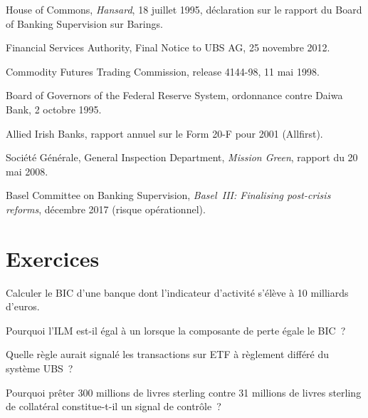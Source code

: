 \begin{omsources}
\item House of Commons, \emph{Hansard}, 18 juillet 1995, déclaration sur le rapport du Board of Banking Supervision
sur Barings.
\item Financial Services Authority, Final Notice to UBS AG, 25 novembre 2012.
\item Commodity Futures Trading Commission, release 4144-98, 11 mai 1998.
\item Board of Governors of the Federal Reserve System, ordonnance contre Daiwa Bank, 2 octobre 1995.
\item Allied Irish Banks, rapport annuel sur le Form 20-F pour 2001 (Allfirst).
\item Société Générale, General Inspection Department, \emph{Mission Green}, rapport du 20 mai 2008.
\item Basel Committee on Banking Supervision, \emph{Basel~III: Finalising post-crisis reforms}, décembre
2017 (risque opérationnel).
\end{omsources}

\section{Exercices}

\begin{exercise}[$\star$]\label{exo:rc:operational-risk-and-rogue-trading:1}
Calculer le BIC d'une banque dont l'indicateur d'activité s'élève à 10 milliards d'euros.
\end{exercise}

\begin{exercise}[$\star$]\label{exo:rc:operational-risk-and-rogue-trading:2}
Pourquoi l'ILM est-il égal à un lorsque la composante de perte égale le BIC~?
\end{exercise}

\begin{exercise}[$\star$]\label{exo:rc:operational-risk-and-rogue-trading:3}
Quelle règle aurait signalé les transactions sur ETF à règlement différé du système UBS~?
\end{exercise}

\begin{exercise}[$\star\star$]\label{exo:rc:operational-risk-and-rogue-trading:4}
Pourquoi prêter 300 millions de livres sterling contre 31 millions de livres sterling de collatéral constitue-t-il un signal de contrôle~?
\end{exercise}

